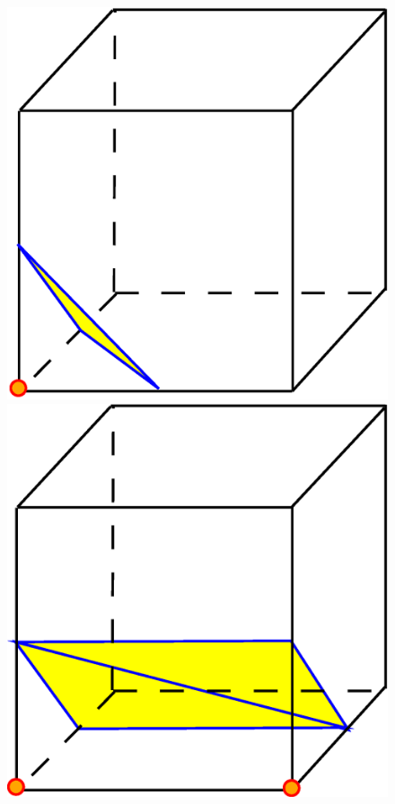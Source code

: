 \begin{figure}[ht]
\includegraphics[scale=0.15]{../img/mar_cub_case1.eps}
\includegraphics[scale=0.15]{../img/mar_cub_case2.eps}

\end{figure}
